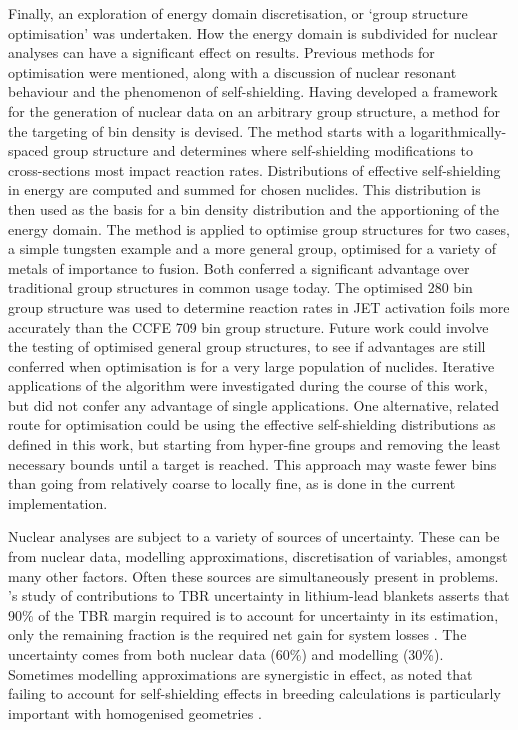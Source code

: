 Finally, an exploration of energy domain discretisation, or `group structure optimisation' was undertaken. How the energy domain is subdivided for nuclear analyses can have a significant effect on results. Previous methods for optimisation were mentioned, along with a discussion of nuclear resonant behaviour and the phenomenon of self-shielding. Having developed a framework for the generation of nuclear data on an arbitrary group structure, a method for the targeting of bin density is devised. The method starts with a logarithmically-spaced group structure and determines where self-shielding modifications to cross-sections most impact reaction rates. Distributions of effective self-shielding in energy are computed and summed for chosen nuclides. This distribution is then used as the basis for a bin density distribution and the apportioning of the energy domain. The method is applied to optimise group structures for two cases, a simple tungsten example and a more general group, optimised for a variety of metals of importance to fusion. Both conferred a significant advantage over traditional group structures in common usage today. The optimised 280 bin group structure was used to determine reaction rates in JET activation foils more accurately than the CCFE 709 bin group structure. Future work could involve the testing of optimised general group structures, to see if advantages are still conferred when optimisation is for a very large population of nuclides. Iterative applications of the algorithm were investigated during the course of this work, but did not confer any advantage of single applications. One alternative, related route for optimisation could be using the effective self-shielding distributions as defined in this work, but starting from hyper-fine groups and removing the least necessary bounds until a target is reached. This approach may waste fewer bins than going from relatively coarse to locally fine, as is done in the current implementation.

Nuclear analyses are subject to a variety of sources of uncertainty. These can be from nuclear data, modelling approximations, discretisation of variables, amongst many other factors. Often these sources are simultaneously present in problems. \citeauthor{El-Guebaly2009}'s study of contributions to TBR uncertainty in lithium-lead blankets asserts that 90\% of the TBR margin required is to account for uncertainty in its estimation, only the remaining fraction is the required net gain for system losses \cite{El-Guebaly2009}. The uncertainty comes from both nuclear data (60\%) and modelling (30\%). Sometimes modelling approximations are synergistic in effect, as \citeauthor{Pelloni1989} noted that failing to account for self-shielding effects in breeding calculations is particularly important with homogenised geometries \cite{Pelloni1989}. 


